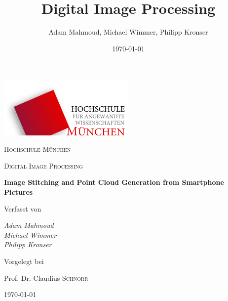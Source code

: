 \documentclass[a4paper,11pt]{scrartcl}
\title{Digital Image Processing}
\author{Adam Mahmoud, Michael Wimmer, Philipp Kronser}
\date{\today}
\begin{document}
\begin{titlepage}
	\centering
	\includegraphics[width=0.5\textwidth]{Figures/LogoHM}\par
	\vspace{1cm}
	{\scshape\LARGE Hochschule München \par}
	\vspace{1cm}
	{\scshape\Large Digital Image Processing\par}
	\vspace{1.5cm}
	{\huge\bfseries Image Stitching and Point Cloud Generation from Smartphone Pictures\par}
	\vspace{2cm}
	Verfasst von\par
	{\Large\itshape Adam Mahmoud\\ Michael Wimmer \\ Philipp Kronser\par}
	\vfill
	Vorgelegt bei\par
	Prof. Dr. Claudius \textsc{Schnörr}
	
	\vfill
	
	{\large \today\par}
\end{titlepage}

\clearpage


\end{document}
